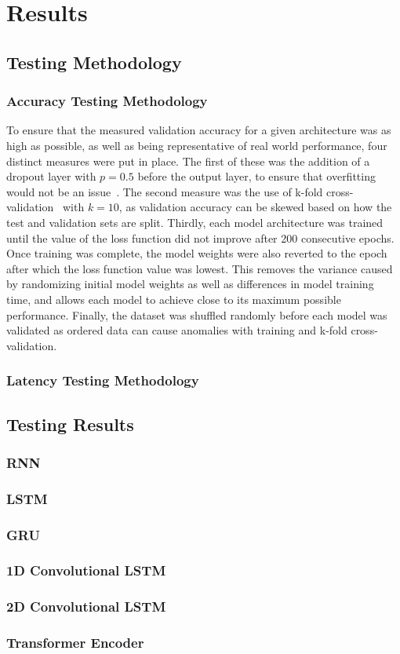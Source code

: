 \section{Results}\label{sec:results}
\subsection{Testing Methodology}\label{subsec:testing-methodology}
\subsubsection{Accuracy Testing Methodology}
To ensure that the measured validation accuracy for a given architecture was as high as possible, as well as being representative of real world performance, four distinct measures were put in place.
The first of these was the addition of a dropout layer with $p=0.5$ before the output layer, to ensure that overfitting would not be an issue~\cite{JMLR:v15:srivastava14a}.
The second measure was the use of k-fold cross-validation~\cite{inbook} with $k=10$, as validation accuracy can be skewed based on how the test and validation sets are split.
Thirdly, each model architecture was trained until the value of the loss function did not improve after 200 consecutive epochs.
Once training was complete, the model weights were also reverted to the epoch after which the loss function value was lowest.
This removes the variance caused by randomizing initial model weights as well as differences in model training time, and allows each model to achieve close to its maximum possible performance.
Finally, the dataset was shuffled randomly before each model was validated as ordered data can cause anomalies with training and k-fold cross-validation.

\subsubsection{Latency Testing Methodology}

\subsection{Testing Results}\label{subsec:testing-results}
\subsubsection{RNN}

\subsubsection{LSTM}

\subsubsection{GRU}

\subsubsection{1D Convolutional LSTM}

\subsubsection{2D Convolutional LSTM}

\subsubsection{Transformer Encoder}
